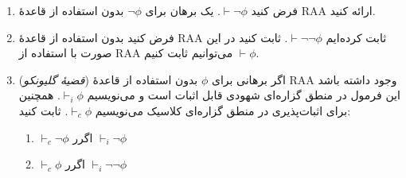 \begin{enumerate}[label=(\alph*)]
    \item فرض کنید $\vdash\neg\phi$. یک برهان برای $\neg\phi$ بدون استفاده از قاعدهٔ {RAA} ارائه کنید.
    \item فرض کنید بدون استفاده از قاعدهٔ {RAA} ثابت کرده‌ایم $\vdash\neg\neg\phi$. ثابت کنید در این صورت با استفاده از {RAA} می‌توانیم ثابت کنیم $\vdash\phi$.
    \item(\emph{قضیهٔ گلیونکو}) اگر برهانی برای $\phi$ بدون استفاده از قاعدهٔ {RAA} وجود داشته باشد این فرمول در منطق گزاره‌ای شهودی قابل اثبات است و می‌نویسیم $\vdash_i\phi$. همچنین برای اثبات‌پذیری در منطق گزاره‌ای کلاسیک می‌نویسیم $\vdash_c\phi$. ثابت کنید:
    \begin{enumerate}[label=(\roman*)]
        \item $\vdash_c\neg\phi$ اگرر $\vdash_i\neg\phi$
        \item $\vdash_c\phi$ اگرر $\vdash_i\neg\neg\phi$
    \end{enumerate}
\end{enumerate}
